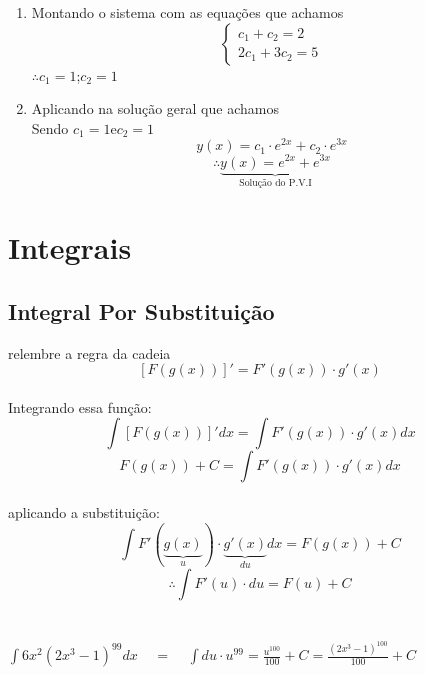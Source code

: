 \documentclass{article}
\begin{document}
{\begin{enumerate}
     $y'(0)=5$\\
     $y'(x)=2c_1e^{2x}+3c_2e^{3x}\xleftarrow{\;\;\;\;\;\;}\text{Usando, agora, a função derivada}$\\
     $y'(0)=2c_1e^{2\cdot 0}+3c_2e^{3\cdot0}$\\
     $y'(0)= 2c_1+3c_2$\\
     $y'(0)= 5 \;\therefore\; \boxed{2c_1+3c_2=5}$\\
     \item Montando o sistema com as equações que achamos\\
     \[
\left\{
\begin{aligned}
c_1+c_2=2 \\
2c_1+3c_2=5
\end{aligned}
\right.
\]
$\therefore c_1=1$\;\;;\;\;$c_2=1$

\item Aplicando na solução geral que achamos\\
Sendo $c_1=1$\;\;e\;\;$c_2=1$\\
\[y(x)=c_1\cdot e^{2x}+c_2\cdot e^{3x}\]
\[\therefore \underbrace{\boxed{y(x)=e^{2x}+e^{3x}}}_{\text{Solução do P.V.I}}\]
     
\end{enumerate}


\section{Integrais}
\subsection{Integral Por Substituição}
relembre a regra da cadeia\\
\[\displaystyle[F(g(x))]'=F'(g\left(x\right))\cdot g'(x)\]\\
Integrando essa função:
\[\displaystyle \int [F(g(x))]'dx = \int F'(g\left(x\right))\cdot g'(x)dx\]
\[F(g(x))+C=\int F'(g\left(x\right))\cdot g'(x)dx\]\\
aplicando a substituição:
\[\displaystyle\int F'(\underbrace{g\left(x\right)}_{u})\cdot \underbrace{g'(x)}_{du}dx=F(g(x))+C\]
\[\therefore \int F'(u)\cdot du=F(u)+C\]
{}\\

\\
$\displaystyle \int 6x^2(2x^3-1)^{99}dx\;\;\;\;= \;\;\;\;\int du\cdot u^{99}= \frac{u^{100}}{100}+C=\frac{(2x^3-1)^{100}}{100}+C$\\ 

}
\end{document}
